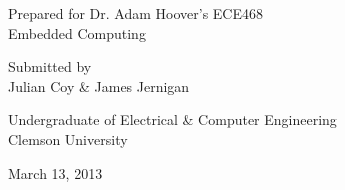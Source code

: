 \documentclass[11pt]{report}
\begin{document}
\begin{spacing}{1.5}

\thispagestyle{empty}

\begin{scshape}

\vspace*{30pt}
{
\Huge
\begin{center}
    \reporttitle
\end{center}
}
\vspace{30pt}

{
\Large
\begin{center}
  Prepared for Dr. Adam Hoover's ECE468 \\
  Embedded Computing
\end{center}
}
\vspace{30pt}
{
\Large 
\begin{center}
  Submitted by \\
  Julian Coy \& James Jernigan
\end{center}
}
\vspace{120pt}

{
\Large
\begin{center}
  Undergraduate of Electrical \& Computer Engineering \\
  Clemson University
\end{center}
}
\vspace{30pt}

{
\Large
\begin{center}
  March 13, 2013
\end{center}
}

\end{scshape}

\clearpage
\setcounter{page}{1}


\nocite{AMD}
\nocite{WIKI}
\nocite{THW}


\end{spacing}
\end{document}
